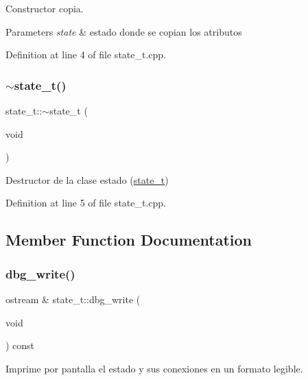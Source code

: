 Constructor copia. 


\begin{DoxyParams}{Parameters}
{\em state} & estado donde se copian los atributos \\
\hline
\end{DoxyParams}


Definition at line 4 of file state\+\_\+t.\+cpp.

\mbox{\label{classstate__t_af27723c21f5cbdbdc237e4bd7aaff2ed}} 
\subsubsection{\texorpdfstring{$\sim$state\+\_\+t()}{~state\_t()}}
{\footnotesize\ttfamily state\+\_\+t\+::$\sim$state\+\_\+t (\begin{DoxyParamCaption}\item[{void}]{ }\end{DoxyParamCaption})}



Destructor de la clase estado (\hyperlink{classstate__t}{state\+\_\+t}) 



Definition at line 5 of file state\+\_\+t.\+cpp.



\subsection{Member Function Documentation}
\mbox{\label{classstate__t_a4cbecc58710974534b8f1dc0592b9ae1}} 
\subsubsection{\texorpdfstring{dbg\+\_\+write()}{dbg\_write()}}
{\footnotesize\ttfamily ostream \& state\+\_\+t\+::dbg\+\_\+write (\begin{DoxyParamCaption}\item[{void}]{ }\end{DoxyParamCaption}) const}



Imprime por pantalla el estado y sus conexiones en un formato legible. 

